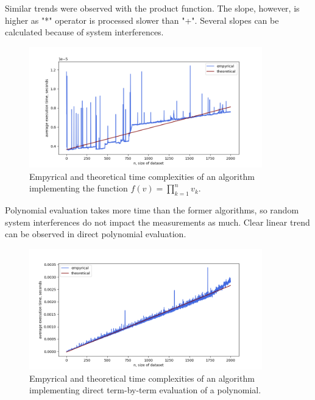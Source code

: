 \documentclass[12pt, a4paper]{article}
\begin{document}
Similar trends were observed with the product function. The slope, however, is higher as "*" operator is processed slower than "+". Several slopes can be calculated because of system interferences.
\begin{figure}[!h]
\centering
\includegraphics[width=0.9\textwidth]{prod.png}
\caption{Empyrical and theoretical time complexities of an algorithm implementing the function $f(v)=\prod_{k=1}^{n} v_k$.}
\end{figure}

Polynomial evaluation takes more time than the former algorithms, so random system interferences do not impact the measurements as much. Clear linear trend can be observed in direct polynomial evaluation.
\begin{figure}[!h]
\centering
\includegraphics[width=0.9\textwidth]{polydirect.png}
\caption{Empyrical and theoretical time complexities of an algorithm implementing direct term-by-term evaluation of a polynomial.}
\end{figure}

\newpage
\end{document}
